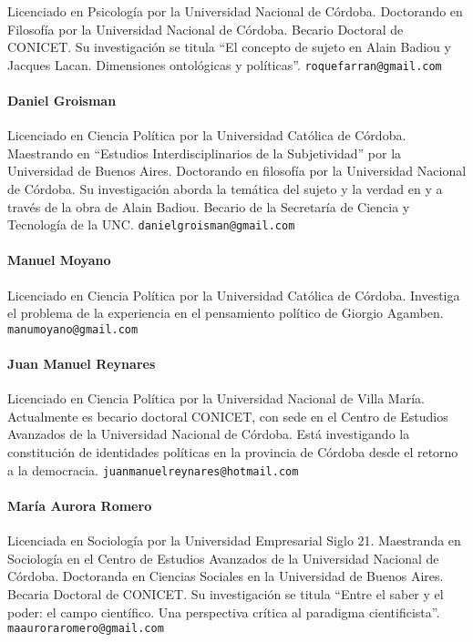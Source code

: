Licenciado en Psicología por la Universidad Nacional de Córdoba. Doctorando en Filosofía por la Universidad Nacional de Córdoba. Becario Doctoral de CONICET. Su investigación se titula \enquote{El concepto de sujeto en Alain Badiou y Jacques Lacan. Dimensiones ontológicas y políticas}. \nolinkurl{roquefarran@gmail.com}


\paragraph{Daniel Groisman}


Licenciado en Ciencia Política por la Universidad Católica de Córdoba. Maestrando en \enquote{Estudios Interdisciplinarios de la Subjetividad} por la Universidad de Buenos Aires. Doctorando en filosofía por la Universidad Nacional de Córdoba. Su investigación aborda la temática del sujeto y la verdad en y a través de la obra de Alain Badiou. Becario de la Secretaría de Ciencia y Tecnología de la UNC. \nolinkurl{danielgroisman@gmail.com}


\paragraph{Manuel Moyano}


Licenciado en Ciencia Política por la Universidad Católica de Córdoba. Investiga el problema de la experiencia en el pensamiento político de Giorgio Agamben. \nolinkurl{manumoyano@gmail.com}


\paragraph{Juan Manuel Reynares}


Licenciado en Ciencia Política por la Universidad Nacional de Villa María. Actualmente es becario doctoral CONICET, con sede en el Centro de Estudios Avanzados de la Universidad Nacional de Córdoba. Está investigando la constitución de identidades políticas en la provincia de Córdoba desde el retorno a la democracia. \nolinkurl{juanmanuelreynares@hotmail.com}


\paragraph{María Aurora Romero}


Licenciada en Sociología por la Universidad Empresarial Siglo 21. Maestranda en Sociología en el Centro de Estudios Avanzados de la Universidad Nacional de Córdoba. Doctoranda en Ciencias Sociales en la Universidad de Buenos Aires. Becaria Doctoral de CONICET. Su investigación se titula \enquote{Entre el saber y el poder: el campo científico. Una perspectiva crítica al paradigma cientificista}. \nolinkurl{maauroraromero@gmail.com}


